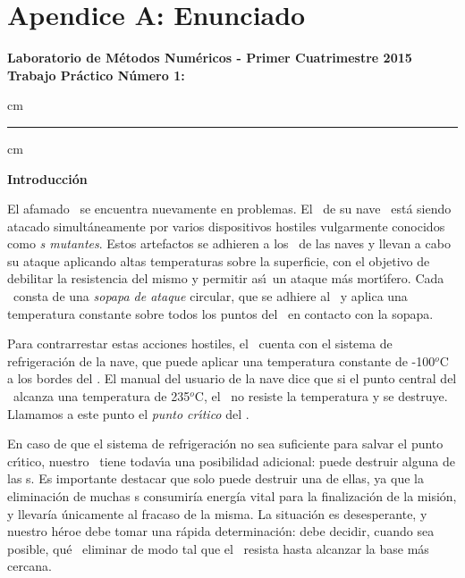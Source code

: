 \section{Apendice A: Enunciado}

\begin{centering}
\large\bf Laboratorio de M\'etodos Num\'ericos - Primer Cuatrimestre 2015 \\
\large\bf Trabajo Pr\'actico N\'umero 1: \emph{\titulotp}\\
\end{centering}

 cm
\hrule
{} cm

{\noindent \bf Introducci\'on}

El afamado \capitan\ se encuentra nuevamente en problemas. El
\objeto\ de su nave \nave\ est\'a siendo atacado simult\'aneamente por varios
dispositivos hostiles vulgarmente conocidos como \emph{\atacante s
mutantes}. Estos artefactos se adhieren a los \objeto\ de las naves y
llevan a cabo su ataque aplicando altas temperaturas sobre la superficie, con
el objetivo de debilitar la resistencia del mismo y permitir as\'\i \
un ataque m\'as mort\'\i fero. Cada \atacante\ consta de una \emph{sopapa
de ataque} circular, que se adhiere al \objeto\ y aplica una temperatura
constante sobre todos los puntos del \objeto\ en contacto con la sopapa.

Para con\-tra\-rres\-tar estas acciones hostiles, el \capitan\ cuenta con el sistema de refrigeraci\'on de la nave, que puede aplicar una temperatura constante de -100${}^o$C a los bordes del \objeto.
El manual del usuario de la nave dice que si el punto central del \objeto\ 
alcanza una temperatura de 235${}^o$C, el \objeto\ no resiste la temperatura
y se destruye. Llamamos a este punto el \emph{punto cr\'\i tico} del
\objeto.

En caso de que el sistema de refrigeraci\'on no sea suficiente para salvar
el punto cr\'\i tico, nues\-tro \capitan\ tiene todav\'\i a una posibilidad
adicional: puede des\-tru\-ir alguna de las \atacante s. Es importante destacar que solo puede destruir una de ellas, ya que la eliminaci\'on de muchas \atacante s consumir\'ia  energ\'ia vital para la finalizaci\'on  de la misi\'on, y llevar\'ia \'unicamente al fracaso de la misma.
La situaci\'on es desesperante, y nuestro h\'eroe debe tomar una r\'apida
determinaci\'on: debe decidir, cuando sea posible, qu\'e \atacante\ eliminar de modo tal que el \objeto\ resista hasta alcanzar la base m\'as cercana.

